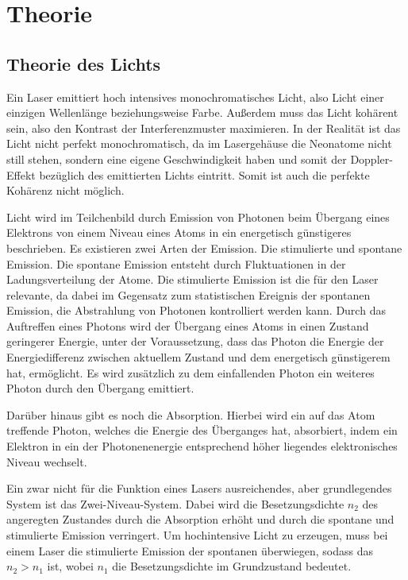 \section{Theorie}
\subsection{Theorie des Lichts}
Ein Laser emittiert hoch intensives monochromatisches Licht, also Licht einer einzigen Wellenlänge beziehungsweise Farbe. Außerdem muss das Licht kohärent sein, also den Kontrast der Interferenzmuster maximieren. In der Realität ist das Licht nicht perfekt monochromatisch, da im Lasergehäuse die Neonatome nicht still stehen, sondern eine eigene Geschwindigkeit haben und somit der Doppler-Effekt bezüglich des emittierten Lichts eintritt. Somit ist auch die perfekte Kohärenz nicht möglich.

\noindent Licht wird im Teilchenbild durch Emission von Photonen beim Übergang eines Elektrons von einem Niveau eines Atoms in ein energetisch günstigeres beschrieben. Es existieren zwei Arten der Emission. Die stimulierte und spontane Emission. Die spontane Emission entsteht durch Fluktuationen in der Ladungsverteilung der Atome. Die stimulierte Emission ist die für den Laser relevante, da dabei im Gegensatz zum statistischen Ereignis der spontanen Emission, die Abstrahlung von Photonen kontrolliert werden kann. Durch das Auftreffen eines Photons wird der Übergang eines Atoms in einen Zustand geringerer Energie, unter der Voraussetzung, dass das Photon die Energie der Energiedifferenz zwischen aktuellem Zustand und dem energetisch günstigerem hat, ermöglicht. Es wird zusätzlich zu dem einfallenden Photon ein weiteres Photon durch den Übergang emittiert. 

\noindent Darüber hinaus gibt es noch die Absorption. Hierbei wird ein auf das Atom treffende Photon, welches die Energie des Überganges hat, absorbiert, indem ein Elektron in ein der Photonenenergie entsprechend höher liegendes elektronisches Niveau wechselt.

\noindent Ein zwar nicht für die Funktion eines Lasers ausreichendes, aber grundlegendes System ist das Zwei-Niveau-System. Dabei wird die Besetzungsdichte \(n_2\) des angeregten Zustandes durch die Absorption erhöht und durch die spontane und stimulierte Emission verringert. Um hochintensive Licht zu erzeugen, muss bei einem Laser die stimulierte Emission der spontanen überwiegen, sodass das \(n_2>n_1\) ist, wobei \(n_1\) die Besetzungsdichte im Grundzustand bedeutet.

